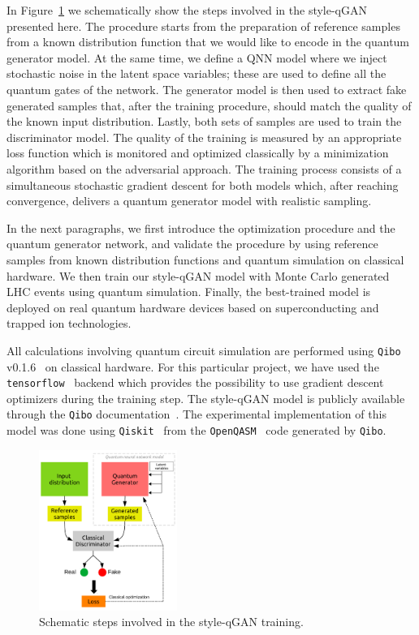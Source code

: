 \documentclass[twocolumn,preprintnumbers,superscriptaddress]{revtex4-2}
\begin{document}
In Figure~\ref{fig:scheme} we schematically show the steps involved in the style-qGAN
presented here. The procedure starts from the preparation of reference samples from a
known distribution function that we would like to encode in the quantum
generator model. At the same time, we define a QNN model where
we inject stochastic noise in the latent space variables; these are used to
define all the quantum gates of the network. The generator model is then used to extract fake generated samples
that, after the training procedure, should match the quality of the known input
distribution. Lastly, both sets of samples are used to train the discriminator
model. The quality of the training is measured by an appropriate loss function
which is monitored and optimized classically by a minimization algorithm based on
the adversarial approach. The training process consists of a simultaneous
stochastic gradient descent for both models which, after reaching convergence,
delivers a quantum generator model with realistic sampling.

In the next paragraphs, we first introduce the optimization procedure and the quantum
generator network, and validate the procedure by using reference samples from known
distribution functions and quantum simulation on classical hardware. We then
train our style-qGAN model with Monte Carlo generated LHC events using quantum
simulation. Finally, the best-trained model is deployed on real quantum hardware
devices based on superconducting and trapped ion technologies.

All calculations involving quantum circuit simulation are performed using
{\tt Qibo} v0.1.6~\cite{efthymiou2020qibo,stavros_efthymiou_2021_5088103} on
classical hardware. For this particular project, we have used the {\tt
tensorflow}~\cite{tensorflow2015-whitepaper} backend which provides the
possibility to use gradient descent optimizers during the training step. The
style-qGAN model is publicly available through the {\tt Qibo}
documentation~\cite{add_cite_tutorial}. The experimental implementation of this
model was done using {\tt Qiskit}~\cite{gadi_aleksandrowicz_2019_2562111} from
the {\tt OpenQASM}~\cite{cross2017open} code generated by {\tt Qibo}.

\begin{figure}
  \includegraphics[width=0.4\textwidth]{plots/scheme2.pdf}
  \caption{\label{fig:scheme} Schematic steps involved in the style-qGAN training.}
\end{figure}
\end{document}
